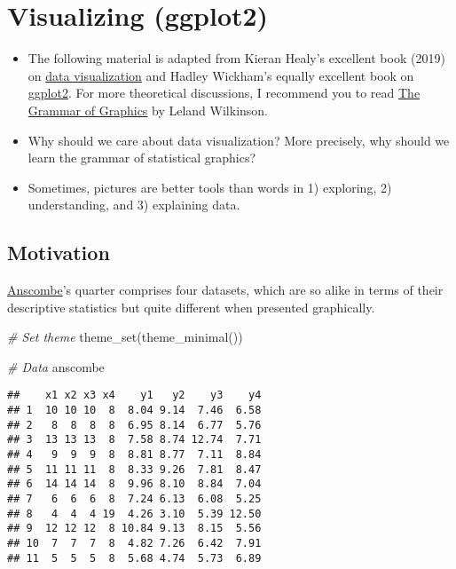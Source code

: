 \documentclass[
]{book}
\newenvironment{Shaded}{\begin{snugshade}}{\end{snugshade}}
\newcommand{\CommentTok}[1]{\textcolor[rgb]{0.56,0.35,0.01}{\textit{#1}}}
\newcommand{\FunctionTok}[1]{\textcolor[rgb]{0.00,0.00,0.00}{#1}}
\newcommand{\NormalTok}[1]{#1}
\begin{document}
\hypertarget{visualizing-ggplot2}{%
\section{Visualizing (ggplot2)}\label{visualizing-ggplot2}}

\begin{itemize}
\item
  The following material is adapted from Kieran Healy's excellent book (2019) on \href{https://socviz.co/}{data visualization} and Hadley Wickham's equally excellent book on \href{https://ggplot2-book.org/}{ggplot2}. For more theoretical discussions, I recommend you to read \href{https://link.springer.com/book/10.1007\%2F0-387-28695-0}{The Grammar of Graphics} by Leland Wilkinson.
\item
  Why should we care about data visualization? More precisely, why should we learn the grammar of statistical graphics?
\item
  Sometimes, pictures are better tools than words in 1) exploring, 2) understanding, and 3) explaining data.
\end{itemize}

\hypertarget{motivation-2}{%
\subsection{Motivation}\label{motivation-2}}

\href{https://en.wikipedia.org/wiki/Frank_Anscombe}{Anscombe}'s quarter comprises four datasets, which are so alike in terms of their descriptive statistics but quite different when presented graphically.

\begin{Shaded}
\begin{Highlighting}[]
\CommentTok{\# Set theme}
\FunctionTok{theme\_set}\NormalTok{(}\FunctionTok{theme\_minimal}\NormalTok{())}
\end{Highlighting}
\end{Shaded}

\begin{Shaded}
\begin{Highlighting}[]
\CommentTok{\# Data}
\NormalTok{anscombe}
\end{Highlighting}
\end{Shaded}

\begin{verbatim}
##    x1 x2 x3 x4    y1   y2    y3    y4
## 1  10 10 10  8  8.04 9.14  7.46  6.58
## 2   8  8  8  8  6.95 8.14  6.77  5.76
## 3  13 13 13  8  7.58 8.74 12.74  7.71
## 4   9  9  9  8  8.81 8.77  7.11  8.84
## 5  11 11 11  8  8.33 9.26  7.81  8.47
## 6  14 14 14  8  9.96 8.10  8.84  7.04
## 7   6  6  6  8  7.24 6.13  6.08  5.25
## 8   4  4  4 19  4.26 3.10  5.39 12.50
## 9  12 12 12  8 10.84 9.13  8.15  5.56
## 10  7  7  7  8  4.82 7.26  6.42  7.91
## 11  5  5  5  8  5.68 4.74  5.73  6.89
\end{verbatim}
\end{document}
